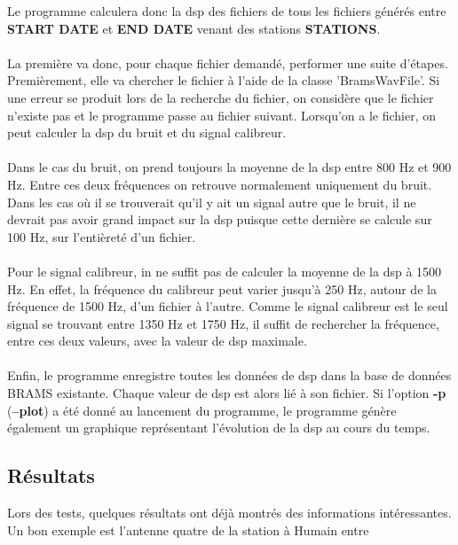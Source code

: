 \documentclass[11pt]{article}
\begin{document}
Le programme calculera donc la dsp des fichiers de tous les fichiers générés entre \textbf{START DATE} et \textbf{END DATE} venant des stations \textbf{STATIONS}.\\
\\
La première va donc, pour chaque fichier demandé, performer une suite d'étapes.
Premièrement, elle va chercher le fichier à l'aide de la classe 'BramsWavFile'.
Si une erreur se produit lors de la recherche du fichier, on considère que le fichier n'existe pas et le programme passe au fichier suivant.
Lorsqu'on a le fichier, on peut calculer la dsp du bruit et du signal calibreur.\\
\\
Dans le cas du bruit, on prend toujours la moyenne de la dsp entre 800 Hz et 900 Hz.
Entre ces deux fréquences on retrouve normalement uniquement du bruit.
Dans les cas où il se trouverait qu'il y ait un signal autre que le bruit, il ne devrait pas avoir grand impact sur la dsp puisque cette dernière se calcule sur 100 Hz, sur l'entièreté d'un fichier.\\
\\
Pour le signal calibreur, in ne suffit pas de calculer la moyenne de la dsp à 1500 Hz.
En effet, la fréquence du calibreur peut varier jusqu'à 250 Hz, autour de la fréquence de 1500 Hz, d'un fichier à l'autre.
Comme le signal calibreur est le seul signal se trouvant entre 1350 Hz et 1750 Hz, il suffit de rechercher la fréquence, entre ces deux valeurs, avec la valeur de dsp maximale.\\
\\
Enfin, le programme enregistre toutes les données de dsp dans la base de données BRAMS existante.
Chaque valeur de dsp est alors lié à son fichier.
Si l'option \textbf{-p} (\textbf{--plot}) a été donné au lancement du programme, le programme génère également un graphique représentant l'évolution de la dsp au cours du temps.

\subsection{Résultats}

Lors des tests, quelques résultats ont déjà montrés des informations intéressantes.
Un bon exemple est l'antenne quatre de la station à Humain entre
\end{document}
